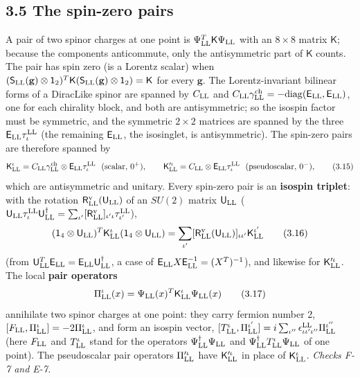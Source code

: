 \documentclass[
  10pt,
]{article}
\begin{document}
\hypertarget{the-spin-zero-pairs}{%
\subsection{3.5 The spin-zero pairs}\label{the-spin-zero-pairs}}

A pair of two spinor charges at one point is
\(\Psi^T_{\rm LL}\mathsf K\Psi_{\rm LL}\) with an \(8\times8\) matrix
\(\mathsf K\); because the components anticommute, only the
antisymmetric part of \(\mathsf K\) counts. The pair has spin zero (is a
Lorentz scalar) when
\((\mathsf S_{\rm LL}(\mathbf g)\otimes\mathsf 1_2)^T\mathsf K(\mathsf S_{\rm LL}(\mathbf g)\otimes\mathsf 1_2)=\mathsf K\)
for every \(\mathbf g\). The Lorentz-invariant bilinear forms of a
DiracLike spinor are spanned by \(C_{\rm LL}\) and
\(C_{\rm LL}\gamma^{\rm ch}_{\rm LL}=-\mathrm{diag}(\mathsf E_{\rm LL},\mathsf E_{\rm LL})\),
one for each chirality block, and both are antisymmetric; so the isospin
factor must be symmetric, and the symmetric \(2\times2\) matrices are
spanned by the three \(\mathsf E_{\rm LL}\tau^{\rm LL}_\iota\) (the
remaining \(\mathsf E_{\rm LL}\), the isosinglet, is antisymmetric). The
spin-zero pairs are therefore spanned by
\[\mathsf K^\iota_{\rm LL}=C_{\rm LL}\gamma^{\rm ch}_{\rm LL}\otimes\mathsf E_{\rm LL}\tau^{\rm LL}_\iota\ \ (\text{scalar},\,0^+),\qquad\mathsf K'^\iota_{\rm LL}=C_{\rm LL}\otimes\mathsf E_{\rm LL}\tau^{\rm LL}_\iota\ \ (\text{pseudoscalar},\,0^-),\tag{3.15}\]
which are antisymmetric and unitary. Every spin-zero pair is an
\textbf{isospin triplet}: with the rotation
\(\mathsf R^{\rm v}_{\rm LL}(\mathsf U_{\rm LL})\) of an \(SU(2)\)
matrix \(\mathsf U_{\rm LL}\)
(\(\mathsf U_{\rm LL}\tau^{\rm LL}_\iota\mathsf U_{\rm LL}^\dagger=\sum_{\iota'}[\mathsf R^{\rm v}_{\rm LL}]_{\iota'\iota}\tau^{\rm LL}_{\iota'}\)),
\[(\mathsf 1_4\otimes\mathsf U_{\rm LL})^T\mathsf K^\iota_{\rm LL}(\mathsf 1_4\otimes\mathsf U_{\rm LL})=\sum_{\iota'}[\mathsf R^{\rm v}_{\rm LL}(\mathsf U_{\rm LL})]_{\iota\iota'}\mathsf K^{\iota'}_{\rm LL}\tag{3.16}\]
(from
\(\mathsf U_{\rm LL}^T\mathsf E_{\rm LL}=\mathsf E_{\rm LL}\mathsf U_{\rm LL}^\dagger\),
a case of \(\mathsf E_{\rm LL}X\mathsf E_{\rm LL}^{-1}=(X^T)^{-1}\)),
and likewise for \(\mathsf K'^\iota_{\rm LL}\). The local \textbf{pair
operators}
\[\Pi^\iota_{\rm LL}(x)=\Psi_{\rm LL}(x)^T\mathsf K^\iota_{\rm LL}\Psi_{\rm LL}(x)\tag{3.17}\]
annihilate two spinor charges at one point: they carry fermion number 2,
\([F_{\rm LL},\Pi^\iota_{\rm LL}]=-2\Pi^\iota_{\rm LL}\), and form an
isospin vector,
\([T^\iota_{\rm LL},\Pi^{\iota'}_{\rm LL}]=i\sum_{\iota''}\epsilon^{\rm LL}_{\iota\iota'\iota''}\Pi^{\iota''}_{\rm LL}\)
(here \(F_{\rm LL}\) and \(T^\iota_{\rm LL}\) stand for the operators
\(\Psi^\dagger_{\rm LL}\Psi_{\rm LL}\) and
\(\Psi^\dagger_{\rm LL}T^\iota_{\rm LL}\Psi_{\rm LL}\) of one point).
The pseudoscalar pair operators \(\Pi'^\iota_{\rm LL}\) have
\(\mathsf K'^\iota_{\rm LL}\) in place of \(\mathsf K^\iota_{\rm LL}\).
\emph{Checks F-7 and E-7.}
\end{document}
